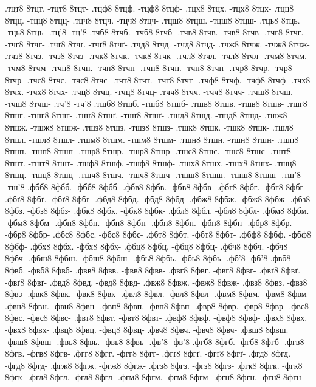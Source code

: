 {.тцт8 8тцт. -тцт8 8тцт-
.тцф8 8тцф. -тцф8 8тцф-
.тцх8 8тцх. -тцх8 8тцх-
.тцц8 8тцц. -тцц8 8тцц-
.тцч8 8тцч. -тцч8 8тцч-
.тцш8 8тцш. -тцш8 8тцш-
.тць8 8тць. -тць8 8тць-
.тц'8 -тц'8
.тчб8 8тчб. -тчб8 8тчб-
.тчв8 8тчв. -тчв8 8тчв-
.тчг8 8тчг. -тчг8 8тчг-
.тчґ8 8тчґ. -тчґ8 8тчґ-
.тчд8 8тчд. -тчд8 8тчд-
.тчж8 8тчж. -тчж8 8тчж-
.тчз8 8тчз. -тчз8 8тчз-
.тчк8 8тчк. -тчк8 8тчк-
.тчл8 8тчл. -тчл8 8тчл-
.тчм8 8тчм. -тчм8 8тчм-
.тчн8 8тчн. -тчн8 8тчн-
.тчп8 8тчп. -тчп8 8тчп-
.тчр8 8тчр. -тчр8 8тчр-
.тчс8 8тчс. -тчс8 8тчс-
.тчт8 8тчт. -тчт8 8тчт-
.тчф8 8тчф. -тчф8 8тчф-
.тчх8 8тчх. -тчх8 8тчх-
.тчц8 8тчц. -тчц8 8тчц-
.тчч8 8тчч. -тчч8 8тчч-
.тчш8 8тчш. -тчш8 8тчш-
.тч'8 -тч'8
.тшб8 8тшб. -тшб8 8тшб-
.тшв8 8тшв. -тшв8 8тшв-
.тшг8 8тшг. -тшг8 8тшг-
.тшґ8 8тшґ. -тшґ8 8тшґ-
.тшд8 8тшд. -тшд8 8тшд-
.тшж8 8тшж. -тшж8 8тшж-
.тшз8 8тшз. -тшз8 8тшз-
.тшк8 8тшк. -тшк8 8тшк-
.тшл8 8тшл. -тшл8 8тшл-
.тшм8 8тшм. -тшм8 8тшм-
.тшн8 8тшн. -тшн8 8тшн-
.тшп8 8тшп. -тшп8 8тшп-
.тшр8 8тшр. -тшр8 8тшр-
.тшс8 8тшс. -тшс8 8тшс-
.тшт8 8тшт. -тшт8 8тшт-
.тшф8 8тшф. -тшф8 8тшф-
.тшх8 8тшх. -тшх8 8тшх-
.тшц8 8тшц. -тшц8 8тшц-
.тшч8 8тшч. -тшч8 8тшч-
.тшш8 8тшш. -тшш8 8тшш-
.тш'8 -тш'8
.фбб8 8фбб. -фбб8 8фбб-
.фбв8 8фбв. -фбв8 8фбв-
.фбг8 8фбг. -фбг8 8фбг-
.фбґ8 8фбґ. -фбґ8 8фбґ-
.фбд8 8фбд. -фбд8 8фбд-
.фбж8 8фбж. -фбж8 8фбж-
.фбз8 8фбз. -фбз8 8фбз-
.фбк8 8фбк. -фбк8 8фбк-
.фбл8 8фбл. -фбл8 8фбл-
.фбм8 8фбм. -фбм8 8фбм-
.фбн8 8фбн. -фбн8 8фбн-
.фбп8 8фбп. -фбп8 8фбп-
.фбр8 8фбр. -фбр8 8фбр-
.фбс8 8фбс. -фбс8 8фбс-
.фбт8 8фбт. -фбт8 8фбт-
.фбф8 8фбф. -фбф8 8фбф-
.фбх8 8фбх. -фбх8 8фбх-
.фбц8 8фбц. -фбц8 8фбц-
.фбч8 8фбч. -фбч8 8фбч-
.фбш8 8фбш. -фбш8 8фбш-
.фбь8 8фбь. -фбь8 8фбь-
.фб'8 -фб'8
.фвб8 8фвб. -фвб8 8фвб-
.фвв8 8фвв. -фвв8 8фвв-
.фвг8 8фвг. -фвг8 8фвг-
.фвґ8 8фвґ. -фвґ8 8фвґ-
.фвд8 8фвд. -фвд8 8фвд-
.фвж8 8фвж. -фвж8 8фвж-
.фвз8 8фвз. -фвз8 8фвз-
.фвк8 8фвк. -фвк8 8фвк-
.фвл8 8фвл. -фвл8 8фвл-
.фвм8 8фвм. -фвм8 8фвм-
.фвн8 8фвн. -фвн8 8фвн-
.фвп8 8фвп. -фвп8 8фвп-
.фвр8 8фвр. -фвр8 8фвр-
.фвс8 8фвс. -фвс8 8фвс-
.фвт8 8фвт. -фвт8 8фвт-
.фвф8 8фвф. -фвф8 8фвф-
.фвх8 8фвх. -фвх8 8фвх-
.фвц8 8фвц. -фвц8 8фвц-
.фвч8 8фвч. -фвч8 8фвч-
.фвш8 8фвш. -фвш8 8фвш-
.фвь8 8фвь. -фвь8 8фвь-
.фв'8 -фв'8
.фгб8 8фгб. -фгб8 8фгб-
.фгв8 8фгв. -фгв8 8фгв-
.фгг8 8фгг. -фгг8 8фгг-
.фгґ8 8фгґ. -фгґ8 8фгґ-
.фгд8 8фгд. -фгд8 8фгд-
.фгж8 8фгж. -фгж8 8фгж-
.фгз8 8фгз. -фгз8 8фгз-
.фгк8 8фгк. -фгк8 8фгк-
.фгл8 8фгл. -фгл8 8фгл-
.фгм8 8фгм. -фгм8 8фгм-
.фгн8 8фгн. -фгн8 8фгн-
}
